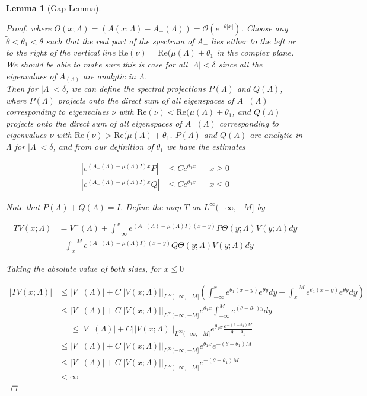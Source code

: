 \documentclass[12pt]{article}
\newtheorem{lemma}{Lemma}
\begin{document}
\begin{lemma}[Gap Lemma]
\begin{proof}
where $\Theta(x; \Lambda) = (A(x; \Lambda) - A_-(\Lambda)) = \mathcal{O}(e^{-\theta|x|})$. Choose any $\tilde{\theta} < \theta_1 < \theta$ such that the real part of the spectrum of $A_-$ lies either to the left or to the right of the vertical line $\text{Re}(\nu) = \text{Re}(\mu(\Lambda) + \theta_1$ in the complex plane. We should be able to make sure this is case for all $|\Lambda| < \delta$ since all the eigenvalues of $A_(\Lambda)$ are analytic in $\Lambda$.\\

Then for $|\Lambda| < \delta$, we can define the spectral projections $P(\Lambda)$ and $Q(\Lambda)$, where $P(\Lambda)$ projects onto the direct sum of all eigenspaces of $A_-(\Lambda)$ corresponding to eigenvalues $\nu$ with $\text{Re}(\nu) < \text{Re}(\mu(\Lambda) + \theta_1$, and $Q(\Lambda)$ projects onto the direct sum of all eigenspaces of $A_-(\Lambda)$ corresponding to eigenvalues $\nu$ with $\text{Re}(\nu) > \text{Re}(\mu(\Lambda) + \theta_1$. $P(\Lambda)$ and $Q(\Lambda)$ are analytic in $\Lambda$ for $|\Lambda| < \delta$, and from our definition of $\theta_1$ we have the estimates

\begin{align*}
\left|e^{(A_-(\Lambda) - \mu(\Lambda)I)x}P \right| &\leq C e^{\theta_1 x} && x \geq 0 \\
\left|e^{(A_-(\Lambda) - \mu(\Lambda)I)x}Q \right| &\leq C e^{\theta_1 x} && x \leq 0
\end{align*}

Note that $P(\Lambda) + Q(\Lambda) = I$. Define the map $T$ on $L^\infty(-\infty, -M]$ by

\begin{align*}
TV(x; \Lambda) &= V^-(\Lambda) 
+ \int_{-\infty}^x e^{(A_-(\Lambda) - \mu(\Lambda)I)(x-y)}P\Theta(y; \Lambda) V(y; \Lambda) dy \\
&- \int_x^{-M} e^{(A_-(\Lambda) - \mu(\Lambda)I)(x-y)}Q\Theta(y; \Lambda) V(y; \Lambda) dy
\end{align*}

Taking the absolute value of both sides, for $x \leq 0$

\begin{align*}
|TV(x; \Lambda)| &\leq |V^-(\Lambda)| + C ||V(x; \Lambda)||_{L^\infty(-\infty, -M]}
\left( \int_{-\infty}^x e^{\theta_1 (x - y)} e^{\theta y} dy + \int_x^{-M} e^{\theta_1 (x - y)} e^{\theta y} dy \right) \\
&\leq |V^-(\Lambda)| + C ||V(x; \Lambda)||_{L^\infty(-\infty, -M]} e^{\theta_1 x} \int_{-\infty}^M e^{(\theta - \theta_1) y} dy \\
&= \leq |V^-(\Lambda)| + C ||V(x; \Lambda)||_{L^\infty(-\infty, -M]} e^{\theta_1 x} \frac{e^{-(\theta - \theta_1)M}}{\theta - \theta_1}\\
&\leq |V^-(\Lambda)| + C ||V(x; \Lambda)||_{L^\infty(-\infty, -M]} e^{\theta_1 x} e^{-(\theta - \theta_1)M} \\
&\leq |V^-(\Lambda)| + C ||V(x; \Lambda)||_{L^\infty(-\infty, -M]} e^{-(\theta - \theta_1)M} \\
& < \infty
\end{align*}


\end{proof}
\end{lemma}
\end{document}
